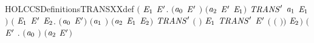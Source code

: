 \begin{SaveVerbatim}{HOLCCSDefinitionsTRANSXXdef}
             \ensuremath{(}\HOLSymConst{\HOLTokenExists{}} \ensuremath{\HOLBoundVar{E}\sb{\mathrm{1}}} \ensuremath{\HOLBoundVar{E}\sp{\prime{}}}.
                \ensuremath{(}\ensuremath{\HOLBoundVar{a}\sb{\mathrm{0}}} \HOLSymConst{\ensuremath{=}} \ensuremath{\HOLBoundVar{E}\sp{\prime{}}} \HOLSymConst{\ensuremath{\mid}} \ensuremath{)} \HOLSymConst{\HOLTokenConj{}} \ensuremath{(}\ensuremath{\HOLBoundVar{a}\sb{\mathrm{2}}} \HOLSymConst{\ensuremath{=}} \ensuremath{\HOLBoundVar{E}\sp{\prime{}}} \HOLSymConst{\ensuremath{\mid}} \ensuremath{\HOLBoundVar{E}\sb{\mathrm{1}}}\ensuremath{)} \HOLSymConst{\HOLTokenConj{}} \ensuremath{\HOLBoundVar{TRANS}\sp{\prime{}}}  \ensuremath{\HOLBoundVar{a}\sb{\mathrm{1}}} \ensuremath{\HOLBoundVar{E}\sb{\mathrm{1}}}\ensuremath{)} \HOLSymConst{\HOLTokenDisj{}}
             \ensuremath{(}\HOLSymConst{\HOLTokenExists{}}  \ensuremath{\HOLBoundVar{E}\sb{\mathrm{1}}} \ensuremath{\HOLBoundVar{E}\sp{\prime{}}} \ensuremath{\HOLBoundVar{E}\sb{\mathrm{2}}}.
                \ensuremath{(}\ensuremath{\HOLBoundVar{a}\sb{\mathrm{0}}} \HOLSymConst{\ensuremath{=}}  \HOLSymConst{\ensuremath{\mid}} \ensuremath{\HOLBoundVar{E}\sp{\prime{}}}\ensuremath{)} \HOLSymConst{\HOLTokenConj{}} \ensuremath{(}\ensuremath{\HOLBoundVar{a}\sb{\mathrm{1}}} \HOLSymConst{\ensuremath{=}} \HOLConst{\ensuremath{\tau}}\ensuremath{)} \HOLSymConst{\HOLTokenConj{}} \ensuremath{(}\ensuremath{\HOLBoundVar{a}\sb{\mathrm{2}}} \HOLSymConst{\ensuremath{=}} \ensuremath{\HOLBoundVar{E}\sb{\mathrm{1}}} \HOLSymConst{\ensuremath{\mid}} \ensuremath{\HOLBoundVar{E}\sb{\mathrm{2}}}\ensuremath{)} \HOLSymConst{\HOLTokenConj{}}
                \ensuremath{\HOLBoundVar{TRANS}\sp{\prime{}}}  \ensuremath{(} \ensuremath{)} \ensuremath{\HOLBoundVar{E}\sb{\mathrm{1}}} \HOLSymConst{\HOLTokenConj{}}
                \ensuremath{\HOLBoundVar{TRANS}\sp{\prime{}}} \ensuremath{\HOLBoundVar{E}\sp{\prime{}}} \ensuremath{(} \ensuremath{(} \ensuremath{)}\ensuremath{)} \ensuremath{\HOLBoundVar{E}\sb{\mathrm{2}}}\ensuremath{)} \HOLSymConst{\HOLTokenDisj{}}
             \ensuremath{(}\HOLSymConst{\HOLTokenExists{}} \ensuremath{\HOLBoundVar{E}\sp{\prime{}}}  .
                \ensuremath{(}\ensuremath{\HOLBoundVar{a}\sb{\mathrm{0}}} \HOLSymConst{\ensuremath{=}}   \ensuremath{)} \HOLSymConst{\HOLTokenConj{}} \ensuremath{(}\ensuremath{\HOLBoundVar{a}\sb{\mathrm{2}}} \HOLSymConst{\ensuremath{=}}   \ensuremath{\HOLBoundVar{E}\sp{\prime{}}}\ensuremath{)} \HOLSymConst{\HOLTokenConj{}}

\end{SaveVerbatim}

